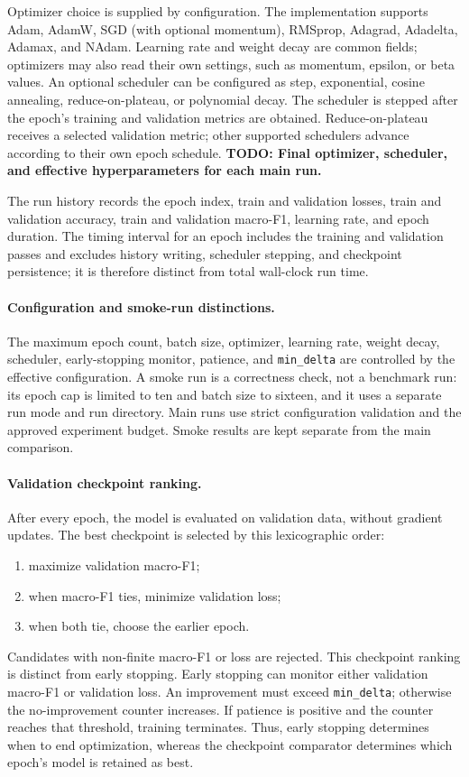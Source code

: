 \documentclass[11pt,a4paper]{article}
\begin{document}
Optimizer choice is supplied by configuration. The implementation supports Adam, AdamW, SGD (with optional momentum), RMSprop, Adagrad, Adadelta, Adamax, and NAdam. Learning rate and weight decay are common fields; optimizers may also read their own settings, such as momentum, epsilon, or beta values. An optional scheduler can be configured as step, exponential, cosine annealing, reduce-on-plateau, or polynomial decay. The scheduler is stepped after the epoch's training and validation metrics are obtained. Reduce-on-plateau receives a selected validation metric; other supported schedulers advance according to their own epoch schedule. \textbf{TODO: Final optimizer, scheduler, and effective hyperparameters for each main run.}

The run history records the epoch index, train and validation losses, train and validation accuracy, train and validation macro-F1, learning rate, and epoch duration. The timing interval for an epoch includes the training and validation passes and excludes history writing, scheduler stepping, and checkpoint persistence; it is therefore distinct from total wall-clock run time.

\paragraph{Configuration and smoke-run distinctions.} The maximum epoch count, batch size, optimizer, learning rate, weight decay, scheduler, early-stopping monitor, patience, and \texttt{min\_delta} are controlled by the effective configuration. A smoke run is a correctness check, not a benchmark run: its epoch cap is limited to ten and batch size to sixteen, and it uses a separate run mode and run directory. Main runs use strict configuration validation and the approved experiment budget. Smoke results are kept separate from the main comparison.

\paragraph{Validation checkpoint ranking.} After every epoch, the model is evaluated on validation data, without gradient updates. The best checkpoint is selected by this lexicographic order:
\begin{enumerate}[leftmargin=*]
  \item maximize validation macro-F1;
  \item when macro-F1 ties, minimize validation loss;
  \item when both tie, choose the earlier epoch.
\end{enumerate}
Candidates with non-finite macro-F1 or loss are rejected. This checkpoint ranking is distinct from early stopping. Early stopping can monitor either validation macro-F1 or validation loss. An improvement must exceed \texttt{min\_delta}; otherwise the no-improvement counter increases. If patience is positive and the counter reaches that threshold, training terminates. Thus, early stopping determines when to end optimization, whereas the checkpoint comparator determines which epoch's model is retained as best.
\end{document}
